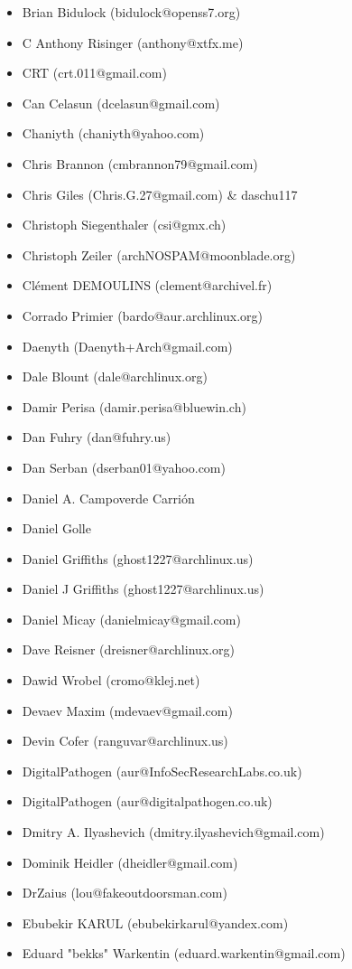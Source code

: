 \begin{latin}
\begin{itemize}
\item  Brian Bidulock (bidulock@openss7.org)
\item  C Anthony Risinger (anthony@xtfx.me)
\item  CRT (crt.011@gmail.com)
\item  Can Celasun (dcelasun@gmail.com)
\item  Chaniyth (chaniyth@yahoo.com)
\item  Chris Brannon (cmbrannon79@gmail.com)
\item  Chris Giles (Chris.G.27@gmail.com) \& daschu117
\item  Christoph Siegenthaler (csi@gmx.ch)
\item  Christoph Zeiler (archNOSPAM@moonblade.org)
\item  Clément DEMOULINS (clement@archivel.fr)
\item  Corrado Primier (bardo@aur.archlinux.org)
\item  Daenyth (Daenyth+Arch@gmail.com)
\item  Dale Blount (dale@archlinux.org)
\item  Damir Perisa (damir.perisa@bluewin.ch)
\item  Dan Fuhry (dan@fuhry.us)
\item  Dan Serban (dserban01@yahoo.com)
\item  Daniel A. Campoverde Carrión
\item  Daniel Golle
\item  Daniel Griffiths (ghost1227@archlinux.us)
\item  Daniel J Griffiths (ghost1227@archlinux.us)
\item  Daniel Micay (danielmicay@gmail.com)
\item  Dave Reisner (dreisner@archlinux.org)
\item  Dawid Wrobel (cromo@klej.net)
\item  Devaev Maxim (mdevaev@gmail.com)
\item  Devin Cofer (ranguvar@archlinux.us)
\item  DigitalPathogen (aur@InfoSecResearchLabs.co.uk)
\item  DigitalPathogen (aur@digitalpathogen.co.uk)
\item  Dmitry A. Ilyashevich (dmitry.ilyashevich@gmail.com)
\item  Dominik Heidler (dheidler@gmail.com)
\item  DrZaius (lou@fakeoutdoorsman.com)
\item  Ebubekir KARUL (ebubekirkarul@yandex.com)
\item  Eduard "bekks" Warkentin (eduard.warkentin@gmail.com)

\end{itemize}
\end{latin}
